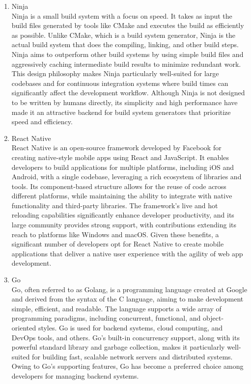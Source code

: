 \documentclass[conference]{IEEEtran}
\begin{document}
\begin{enumerate}[label=\arabic*.]
\begin{enumerate}[label=\alph*.]
\item Ninja\\
Ninja is a small build system with a focus on speed. It takes as input the build files generated by tools like CMake and executes the build as efficiently as possible. Unlike CMake, which is a build system generator, Ninja is the actual build system that does the compiling, linking, and other build steps. Ninja aims to outperform other build systems by using simple build files and aggressively caching intermediate build results to minimize redundant work. This design philosophy makes Ninja particularly well-suited for large codebases and for continuous integration systems where build times can significantly affect the development workflow. Although Ninja is not designed to be written by humans directly, its simplicity and high performance have made it an attractive backend for build system generators that prioritize speed and efficiency.\\
\item React Native\\
React Native is an open-source framework developed by Facebook for creating native-style mobile apps using React and JavaScript. It enables developers to build applications for multiple platforms, including iOS and Android, with a single codebase, leveraging a rich ecosystem of libraries and tools. Its component-based structure allows for the reuse of code across different platforms, while maintaining the ability to integrate with native functionality and third-party libraries. The framework's live and hot reloading capabilities significantly enhance developer productivity, and its large community provides strong support, with contributions extending its reach to platforms like Windows and macOS. Given these benefits, a significant number of developers opt for React Native to create mobile applications that deliver a native user experience with the agility of web app development.\\
\item Go\\
Go, often referred to as Golang, is a programming language created at Google and derived from the syntax of the C language, aiming to make development simple, efficient, and readable. The language supports a wide array of programming paradigms, including concurrent, functional, and object-oriented styles. Go is used for backend systems, cloud computing, and DevOps tools, and others. Go's built-in concurrency support, along with its powerful standard library and garbage collection, makes it particularly well-suited for building fast, scalable network servers and distributed systems. Owing to Go’s supporting features, Go has become a preferred choice among developers for managing backend systems.\\
\end{enumerate}
\end{enumerate}
\end{document}
